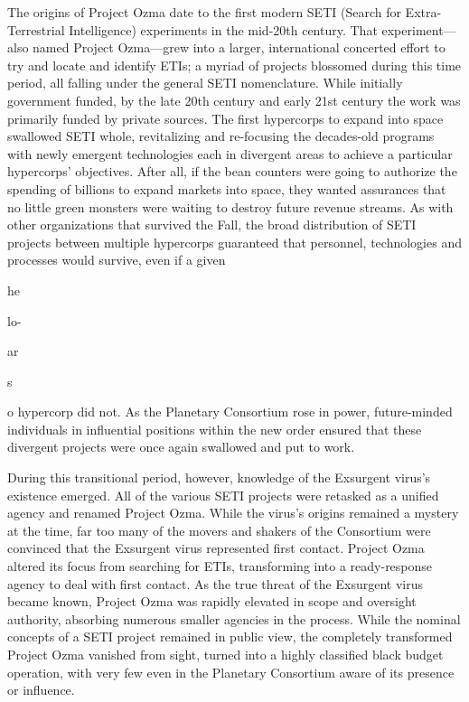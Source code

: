 The origins of Project Ozma date to the first modern 
SETI (Search for Extra-Terrestrial Intelligence) experiments
in the mid-20th century. That experiment—also
named Project Ozma—grew into a larger, international 
concerted effort to try and locate and identify ETIs; a 
myriad of projects blossomed during this time period, 
all falling under the general SETI nomenclature. While 
initially government funded, by the late 20th century 
and early 21st century the work was primarily funded 
by private sources. 
The first hypercorps to expand into space swallowed
SETI whole, revitalizing and re-focusing the
decades-old programs with newly emergent technologies
each in divergent areas to achieve a particular
hypercorps' objectives. After all, if the bean counters 
were going to authorize the spending of billions to 
expand markets into space, they wanted assurances 
that no little green monsters were waiting to destroy 
future revenue streams. 
As with other organizations that survived the Fall, 
the broad distribution of SETI projects between 
multiple hypercorps guaranteed that personnel, technologies
and processes would survive, even if a given

he

lo-

ar

s

o 
hypercorp did not. As the Planetary Consortium rose 
in power, future-minded individuals in influential positions
within the new order ensured that these divergent
projects were once again swallowed and put to work. 

During this transitional period, however, knowledge
of the Exsurgent virus's existence emerged. All
of the various SETI projects were retasked as a unified 
agency and renamed Project Ozma. While the virus's 
origins remained a mystery at the time, far too many 
of the movers and shakers of the Consortium were 
convinced that the Exsurgent virus represented first 
contact. Project Ozma altered its focus from searching 
for ETIs, transforming into a ready-response agency to 
deal with first contact. As the true threat of the Exsurgent
virus became known, Project Ozma was rapidly
elevated in scope and oversight authority, absorbing 
numerous smaller agencies in the process. While the 
nominal concepts of a SETI project remained in public 
view, the completely transformed Project Ozma vanished
from sight, turned into a highly classified black
budget operation, with very few even in the Planetary 
Consortium aware of its presence or influence. 

